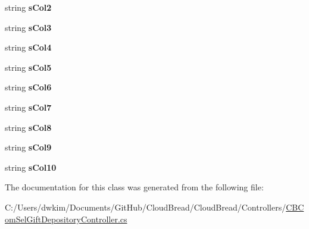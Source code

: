 \begin{DoxyCompactItemize}
\item 
string {\bfseries s\+Col2}\hypertarget{a00164_a52fdceea7bf63de79f5fbdc67511a367}{}\label{a00164_a52fdceea7bf63de79f5fbdc67511a367}

\item 
string {\bfseries s\+Col3}\hypertarget{a00164_a87ae2918300810f46044e8e21b00d8ee}{}\label{a00164_a87ae2918300810f46044e8e21b00d8ee}

\item 
string {\bfseries s\+Col4}\hypertarget{a00164_a03aec1126d875e44289f8ea1ba2ba59b}{}\label{a00164_a03aec1126d875e44289f8ea1ba2ba59b}

\item 
string {\bfseries s\+Col5}\hypertarget{a00164_ae4a2fc01bba0bc633e71b4acb212c204}{}\label{a00164_ae4a2fc01bba0bc633e71b4acb212c204}

\item 
string {\bfseries s\+Col6}\hypertarget{a00164_ae0b5eabeff3beb77023b71fe466c15c0}{}\label{a00164_ae0b5eabeff3beb77023b71fe466c15c0}

\item 
string {\bfseries s\+Col7}\hypertarget{a00164_a4524a5435f5c96a953ca5e3d0c96ba6a}{}\label{a00164_a4524a5435f5c96a953ca5e3d0c96ba6a}

\item 
string {\bfseries s\+Col8}\hypertarget{a00164_a474214588d928ee0dc8939c5d75ce9c6}{}\label{a00164_a474214588d928ee0dc8939c5d75ce9c6}

\item 
string {\bfseries s\+Col9}\hypertarget{a00164_a4a4ff8930452477ab503f6ede17e0411}{}\label{a00164_a4a4ff8930452477ab503f6ede17e0411}

\item 
string {\bfseries s\+Col10}\hypertarget{a00164_a685d61fa24479a55c1c6aa41bcabfc6b}{}\label{a00164_a685d61fa24479a55c1c6aa41bcabfc6b}

\end{DoxyCompactItemize}


The documentation for this class was generated from the following file\+:\begin{DoxyCompactItemize}
\item 
C\+:/\+Users/dwkim/\+Documents/\+Git\+Hub/\+Cloud\+Bread/\+Cloud\+Bread/\+Controllers/\hyperlink{a00200}{C\+B\+Com\+Sel\+Gift\+Depository\+Controller.\+cs}\end{DoxyCompactItemize}
